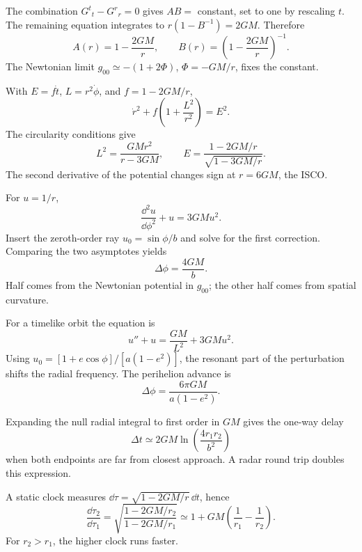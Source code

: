 \begin{solutions}

\begin{solution}
The combination \(G^t{}_t-G^r{}_r=0\) gives \(AB=\) constant, set to one by
rescaling \(t\).  The remaining equation integrates to
\(r(1-B^{-1})=2GM\).  Therefore
\[
A(r)=1-\frac{2GM}{r},\qquad
B(r)=\left(1-\frac{2GM}{r}\right)^{-1}.
\]
The Newtonian limit \(g_{00}\simeq-(1+2\Phi)\), \(\Phi=-GM/r\), fixes the
constant.
\end{solution}

\begin{solution}
With \(E=f\dot t\), \(L=r^2\dot\phi\), and \(f=1-2GM/r\),
\[
\dot r^2+f\left(1+\frac{L^2}{r^2}\right)=E^2.
\]
The circularity conditions give
\[
L^2=\frac{GMr^2}{r-3GM},\qquad
E=\frac{1-2GM/r}{\sqrt{1-3GM/r}}.
\]
The second derivative of the potential changes sign at \(r=6GM\), the ISCO.
\end{solution}

\begin{solution}
For \(u=1/r\),
\[
\frac{\dd^2u}{\dd\phi^2}+u=3GMu^2.
\]
Insert the zeroth-order ray \(u_0=\sin\phi/b\) and solve for the first
correction.  Comparing the two asymptotes yields
\[
\Delta\phi=\frac{4GM}{b}.
\]
Half comes from the Newtonian potential in \(g_{00}\); the other half comes
from spatial curvature.
\end{solution}

\begin{solution}
For a timelike orbit the equation is
\[
u''+u=\frac{GM}{L^2}+3GMu^2.
\]
Using \(u_0=[1+e\cos\phi]/[a(1-e^2)]\), the resonant part of the perturbation
shifts the radial frequency.  The perihelion advance is
\[
\Delta\phi=\frac{6\pi GM}{a(1-e^2)}.
\]
\end{solution}

\begin{solution}
Expanding the null radial integral to first order in \(GM\) gives the one-way
delay
\[
\Delta t
\simeq2GM\ln\left(\frac{4r_1r_2}{b^2}\right)
\]
when both endpoints are far from closest approach.  A radar round trip
doubles this expression.
\end{solution}

\begin{solution}
A static clock measures
\(\dd\tau=\sqrt{1-2GM/r}\,\dd t\), hence
\[
\frac{\dd\tau_2}{\dd\tau_1}
=\sqrt{\frac{1-2GM/r_2}{1-2GM/r_1}}
\simeq1+GM\left(\frac1{r_1}-\frac1{r_2}\right).
\]
For \(r_2>r_1\), the higher clock runs faster.
\end{solution}


\end{solutions}
